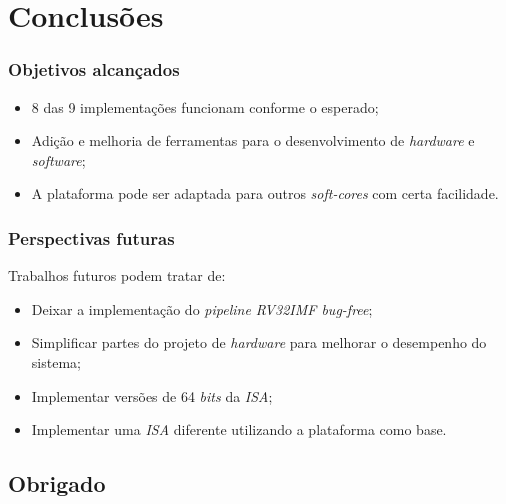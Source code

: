 \documentclass[aspectratio=169]{beamer}
\begin{document}
\section{Conclusões}
    \begin{frame}
        \frametitle{Objetivos alcançados}
        \vfill
        \begin{itemize}
            \item 8 das 9 implementações funcionam conforme o esperado;
            \item Adição e melhoria de ferramentas para o desenvolvimento de \textit{hardware} e \textit{software};
            \item A plataforma pode ser adaptada para outros \textit{soft-cores} com certa facilidade.
        \end{itemize}
        \vfill
    \end{frame}

    \begin{frame}
        \vfill
        \frametitle{Perspectivas futuras}
        {Trabalhos futuros podem tratar de:}
        \begin{itemize}
            \item Deixar a implementação do \textit{pipeline RV32IMF bug-free};
            \item Simplificar partes do projeto de \textit{hardware} para melhorar o desempenho do sistema;
            \item Implementar versões de 64 \textit{bits} da \textit{ISA};
            \item Implementar uma \textit{ISA} diferente utilizando a plataforma como base.
        \end{itemize}
        \vfill
    \end{frame}

    \subsection{Obrigado}
\end{document}
